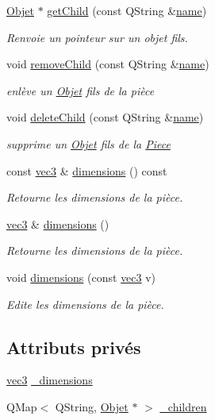 \begin{DoxyCompactItemize}
\hyperlink{class_objet}{Objet} $\ast$ \hyperlink{class_piece_aa77dc9ed8493cc22d1455c3eb2bec013}{get\+Child} (const Q\+String \&\hyperlink{class_objet_a4a702c189bedcbf1e65da6aec72c8e44}{name})
\begin{DoxyCompactList}\small\item\em Renvoie un pointeur sur un objet fils. \end{DoxyCompactList}\item 
void \hyperlink{class_piece_a133ad0c10c91b183fb145fe54ea6c0f1}{remove\+Child} (const Q\+String \&\hyperlink{class_objet_a4a702c189bedcbf1e65da6aec72c8e44}{name})
\begin{DoxyCompactList}\small\item\em enlève un \hyperlink{class_objet}{Objet} fils de la pièce \end{DoxyCompactList}\item 
void \hyperlink{class_piece_a49b725ce33449c3099253288ea261349}{delete\+Child} (const Q\+String \&\hyperlink{class_objet_a4a702c189bedcbf1e65da6aec72c8e44}{name})
\begin{DoxyCompactList}\small\item\em supprime un \hyperlink{class_objet}{Objet} fils de la \hyperlink{class_piece}{Piece} \end{DoxyCompactList}\item 
const \hyperlink{structvec3}{vec3} \& \hyperlink{class_piece_afbfee8c5de17e5b046bcddd83043e5b6}{dimensions} () const 
\begin{DoxyCompactList}\small\item\em Retourne les dimensions de la pièce. \end{DoxyCompactList}\item 
\hyperlink{structvec3}{vec3} \& \hyperlink{class_piece_a3f5440ec22866d79a26a513470744412}{dimensions} ()
\begin{DoxyCompactList}\small\item\em Retourne les dimensions de la pièce. \end{DoxyCompactList}\item 
void \hyperlink{class_piece_a4419c3b0a9e57dcd215dd87be025752f}{dimensions} (const \hyperlink{structvec3}{vec3} v)
\begin{DoxyCompactList}\small\item\em Edite les dimensions de la pièce. \end{DoxyCompactList}\end{DoxyCompactItemize}
\subsection*{Attributs privés}
\begin{DoxyCompactItemize}
\item 
\hyperlink{structvec3}{vec3} \hyperlink{class_piece_a47a3458694b894041bd95a1666c9bf3d}{\+\_\+dimensions}
\item 
Q\+Map$<$ Q\+String, \hyperlink{class_objet}{Objet} $\ast$ $>$ \hyperlink{class_piece_ac80078a597e7edcd297895bab25731e6}{\+\_\+children}
\end{DoxyCompactItemize}
